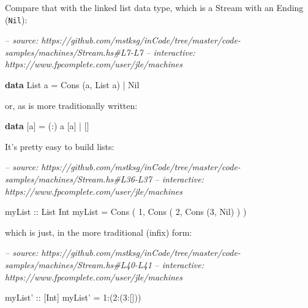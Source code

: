 \documentclass[]{article}
\newenvironment{Shaded}{}{}
\newcommand{\CommentTok}[1]{\textcolor[rgb]{0.38,0.63,0.69}{\textit{#1}}}
\newcommand{\DataTypeTok}[1]{\textcolor[rgb]{0.56,0.13,0.00}{#1}}
\newcommand{\DecValTok}[1]{\textcolor[rgb]{0.25,0.63,0.44}{#1}}
\newcommand{\FunctionTok}[1]{\textcolor[rgb]{0.02,0.16,0.49}{#1}}
\newcommand{\KeywordTok}[1]{\textcolor[rgb]{0.00,0.44,0.13}{\textbf{#1}}}
\newcommand{\NormalTok}[1]{#1}
\newcommand{\OtherTok}[1]{\textcolor[rgb]{0.00,0.44,0.13}{#1}}
\begin{document}
Compare that with the linked list data type, which is a Stream with an Ending
(\texttt{Nil}):

\begin{Shaded}
\begin{Highlighting}[]
\CommentTok{-- source: https://github.com/mstksg/inCode/tree/master/code-samples/machines/Stream.hs#L7-L7}
\CommentTok{-- interactive: https://www.fpcomplete.com/user/jle/machines}

\KeywordTok{data} \DataTypeTok{List}\NormalTok{ a }\FunctionTok{=} \DataTypeTok{Cons}\NormalTok{ (a, }\DataTypeTok{List}\NormalTok{ a) }\FunctionTok{|} \DataTypeTok{Nil}
\end{Highlighting}
\end{Shaded}

or, as is more traditionally written:

\begin{Shaded}
\begin{Highlighting}[]
\KeywordTok{data}\NormalTok{ [a] }\FunctionTok{=}\NormalTok{ (}\FunctionTok{:}\NormalTok{) a [a] }\FunctionTok{|}\NormalTok{ []}
\end{Highlighting}
\end{Shaded}

It's pretty easy to build lists:

\begin{Shaded}
\begin{Highlighting}[]
\CommentTok{-- source: https://github.com/mstksg/inCode/tree/master/code-samples/machines/Stream.hs#L36-L37}
\CommentTok{-- interactive: https://www.fpcomplete.com/user/jle/machines}

\OtherTok{myList ::} \DataTypeTok{List} \DataTypeTok{Int}
\NormalTok{myList }\FunctionTok{=} \DataTypeTok{Cons}\NormalTok{ ( }\DecValTok{1}\NormalTok{, }\DataTypeTok{Cons}\NormalTok{ ( }\DecValTok{2}\NormalTok{, }\DataTypeTok{Cons}\NormalTok{ (}\DecValTok{3}\NormalTok{, }\DataTypeTok{Nil}\NormalTok{) ) )}
\end{Highlighting}
\end{Shaded}

which is just, in the more traditional (infix) form:

\begin{Shaded}
\begin{Highlighting}[]
\CommentTok{-- source: https://github.com/mstksg/inCode/tree/master/code-samples/machines/Stream.hs#L40-L41}
\CommentTok{-- interactive: https://www.fpcomplete.com/user/jle/machines}

\OtherTok{myList' ::}\NormalTok{ [}\DataTypeTok{Int}\NormalTok{]}
\NormalTok{myList' }\FunctionTok{=} \DecValTok{1}\FunctionTok{:}\NormalTok{(}\DecValTok{2}\FunctionTok{:}\NormalTok{(}\DecValTok{3}\FunctionTok{:}\NormalTok{[]))}
\end{Highlighting}
\end{Shaded}
\end{document}

